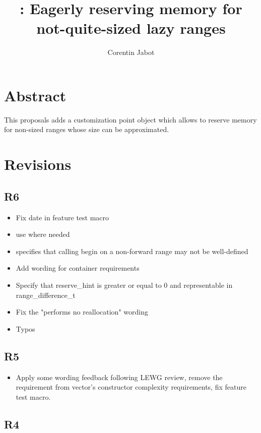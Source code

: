 \documentclass{wg21}
\title{\tcode{reserve\_hint}: Eagerly reserving memory for not-quite-sized lazy ranges}
\author{Corentin Jabot}{corentin.jabot@gmail.com}
\begin{document}
\maketitle

\section{Abstract}

This proposals adds a  customization point object which allows  to
reserve memory for non-sized ranges whose size can be approximated.

\section{Revisions}

\subsection{R6}

\begin{itemize}
\item Fix date in feature test macro
\item use  where needed
\item {} specifies that calling begin on a non-forward range
may not be well-defined
\item Add wording for container requirements
\item Specify that reserve_hint is greater or equal to 0 and representable in range_difference_t
\item Fix the "performs no reallocation" wording
\item Typos
\end{itemize}

\subsection{R5}

\begin{itemize}
\item Apply some wording feedback following LEWG review, remove the 
      requirement from vector's constructor complexity requirements, fix feature test macro.
\end{itemize}

\subsection{R4}
\end{document}
